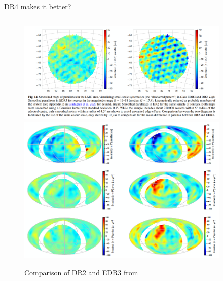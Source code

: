 \documentclass[hyperref={colorlinks = true, linkcolor=blue},8pt]{beamer}
\begin{document}
\begin{frame}{DR4 makes it better?}
\begin{columns}
\begin{column}{0.5\columnwidth}
		\begin{figure}
			\includegraphics[width=\columnwidth]{lmcDR2vsDR3.png}
			\includegraphics[width=\columnwidth]{quasar.png}
			\caption{Comparison of DR2 and EDR3 from \cite{lindegrenGaia2021a}}
		\end{figure}
\end{column}
\begin{column}{0.5\columnwidth}
		\begin{figure}

\end{figure}
\end{column}
\end{columns}
\end{frame}
\end{document}
